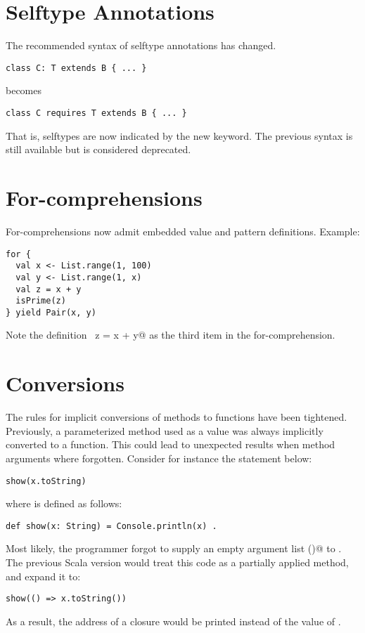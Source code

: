 \documentclass[a4paper,11pt,twoside]{article}
\begin{document}
\section{Selftype Annotations}\label{self}

The recommended syntax of selftype annotations has changed. 
\begin{lstlisting}
class C: T extends B { ... }
\end{lstlisting}
becomes
\begin{lstlisting}
class C requires T extends B { ... }
\end{lstlisting}
That is, selftypes are now indicated by the new \lstinline@requires@
keyword. The previous syntax is still available but is considered deprecated. 

\section{For-comprehensions}\label{fors}

For-comprehensions now admit embedded value and pattern definitions. Example:
\begin{lstlisting}
for {
  val x <- List.range(1, 100)
  val y <- List.range(1, x)
  val z = x + y
  isPrime(z)
} yield Pair(x, y)
\end{lstlisting}
Note the definition ~\lstinline@val z = x + y@ as the third item in
the for-comprehension. 

\section{Conversions}\label{conv}

The rules for implicit conversions of methods to functions have been
tightened. Previously, a parameterized method used as a value was always
implicitly converted to a function. This could lead to unexpected
results when method arguments where forgotten. Consider for instance
the statement below:
\begin{lstlisting}
show(x.toString)
\end{lstlisting}
where \lstinline@show@ is defined as follows:
\begin{lstlisting}
def show(x: String) = Console.println(x) .
\end{lstlisting}
Most likely, the programmer forgot to supply an empty argument list
\lstinline@()@ to \lstinline@toString@. The previous Scala version would
treat this code as a partially applied method, and expand it to:
\begin{lstlisting}
show(() => x.toString())
\end{lstlisting}
As a result, the address of a closure would be printed instead of the
value of \lstinline@s@.
\end{document}
